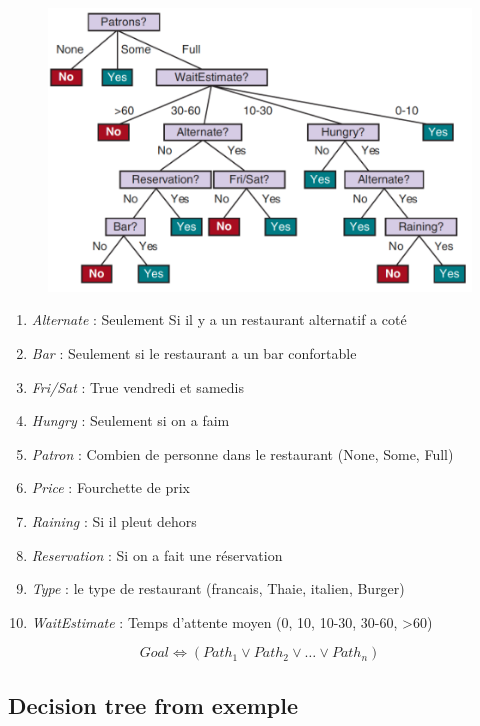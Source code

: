 \documentclass[12pt]{article}
\begin{document}
		\begin{figure}[H]
			\centering
			\includegraphics[width=.8\textwidth]{img/tree.png}
		\end{figure}
		
		\begin{enumerate}
			\item \textit{Alternate} : Seulement Si il y a un restaurant alternatif a coté
			\item \textit{Bar} : Seulement si le restaurant a un bar confortable
			\item \textit{Fri/Sat} : True vendredi et samedis
			\item \textit{Hungry} : Seulement si on a faim
			\item \textit{Patron} : Combien de personne dans le restaurant (None, Some, Full)
			\item \textit{Price} : Fourchette de prix
			\item \textit{Raining} : Si il pleut dehors
			\item \textit{Reservation} : Si on a fait une réservation
			\item \textit{Type} : le type de restaurant (francais, Thaie, italien, Burger)
			\item \textit{WaitEstimate} : Temps d'attente moyen (0, 10, 10-30, 30-60, >60)
		\end{enumerate}
		
		\begin{equation}
			Goal \Leftrightarrow (Path_1 \lor Path_2 \lor \dots \lor Path_n)
		\end{equation}
		
	\subsection{Decision tree from exemple}
	
\end{document}
